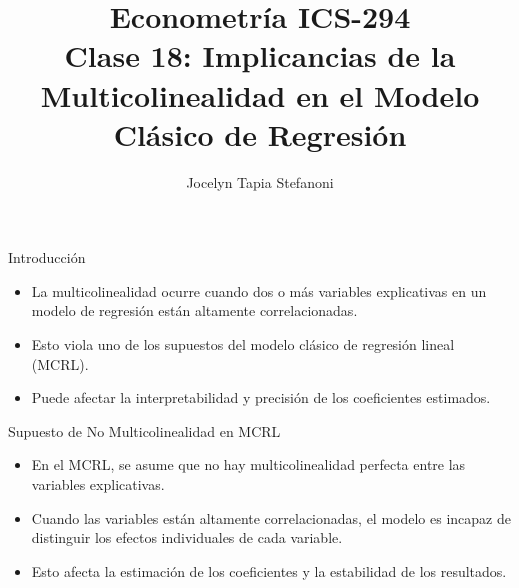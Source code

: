 \documentclass{beamer}
\title[ICS-162]{Econometría ICS-294\\ \small{Clase 18: Implicancias de la Multicolinealidad en el Modelo Clásico de Regresión }}
\author{Jocelyn Tapia Stefanoni}
\institute[USM]
{Universidad Técnica Federico Santa María\\ %
	\medskip
	\textit{} %
	
}
\date{}
\begin{document}
	
\begin{frame}
	\titlepage %


\end{frame}
\logo{}



\begin{frame}{Introducción}
    \begin{itemize}
        \item La multicolinealidad ocurre cuando dos o más variables explicativas en un modelo de regresión están altamente correlacionadas.
        \item Esto viola uno de los supuestos del modelo clásico de regresión lineal (MCRL).
        \item Puede afectar la interpretabilidad y precisión de los coeficientes estimados.
    \end{itemize}
\end{frame}

\begin{frame}{Supuesto de No Multicolinealidad en MCRL}
    \begin{itemize}
        \item En el MCRL, se asume que no hay multicolinealidad perfecta entre las variables explicativas.
        \item Cuando las variables están altamente correlacionadas, el modelo es incapaz de distinguir los efectos individuales de cada variable.
        \item Esto afecta la estimación de los coeficientes y la estabilidad de los resultados.
    \end{itemize}
\end{frame}
\end{document}
